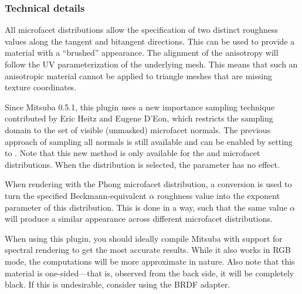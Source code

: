 \subsubsection*{Technical details}
All microfacet distributions allow the specification of two distinct
roughness values along the tangent and bitangent directions. This can be
used to provide a material with a ``brushed'' appearance. The alignment
of the anisotropy will follow the UV parameterization of the underlying
mesh. This means that such an anisotropic material cannot be applied to
triangle meshes that are missing texture coordinates.

\label{sec:visiblenormal-sampling}
Since Mitsuba 0.5.1, this plugin uses a new importance sampling technique
contributed by Eric Heitz and Eugene D'Eon, which restricts the sampling
domain to the set of visible (unmasked) microfacet normals. The previous
approach of sampling all normals is still available and can be enabled
by setting  to .
Note that this new method is only available for the  and
 microfacet distributions. When the  distribution
is selected, the parameter has no effect.

When rendering with the Phong microfacet distribution, a conversion is
used to turn the specified Beckmann-equivalent $\alpha$ roughness value
into the exponent parameter of this distribution. This is done in a way,
such that the same value $\alpha$ will produce a similar appearance across
different microfacet distributions.

When using this plugin, you should ideally compile Mitsuba with support for
spectral rendering to get the most accurate results. While it also works
in RGB mode, the computations will be more approximate in nature.
Also note that this material is one-sided---that is, observed from the
back side, it will be completely black. If this is undesirable,
consider using the  BRDF adapter.

